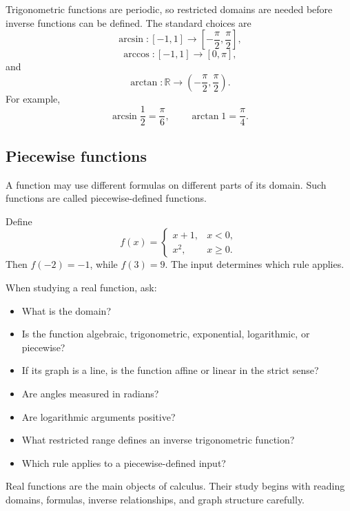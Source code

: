 Trigonometric functions are periodic, so restricted domains are needed before inverse functions can be defined. The standard choices are
\[
\arcsin:[-1,1]\to
\left[-\frac{\pi}{2},\frac{\pi}{2}\right],
\]
\[
\arccos:[-1,1]\to[0,\pi],
\]
and
\[
\arctan:\mathbb{R}\to
\left(-\frac{\pi}{2},\frac{\pi}{2}\right).
\]
For example,
\[
\arcsin\frac12=\frac{\pi}{6},
\qquad
\arctan1=\frac{\pi}{4}.
\]

\subsection*{Piecewise functions}

A function may use different formulas on different parts of its domain. Such functions are called piecewise-defined functions.

\begin{examplebox}
Define
\[
f(x)=
\begin{cases}
x+1, & x<0,\\
x^2, & x\ge0.
\end{cases}
\]
Then \(f(-2)=-1\), while \(f(3)=9\). The input determines which rule applies.
\end{examplebox}

\begin{summarybox}
When studying a real function, ask:
\begin{itemize}
\item What is the domain?
\item Is the function algebraic, trigonometric, exponential, logarithmic, or piecewise?
\item If its graph is a line, is the function affine or linear in the strict sense?
\item Are angles measured in radians?
\item Are logarithmic arguments positive?
\item What restricted range defines an inverse trigonometric function?
\item Which rule applies to a piecewise-defined input?
\end{itemize}
\end{summarybox}

Real functions are the main objects of calculus. Their study begins with reading domains, formulas, inverse relationships, and graph structure carefully.
